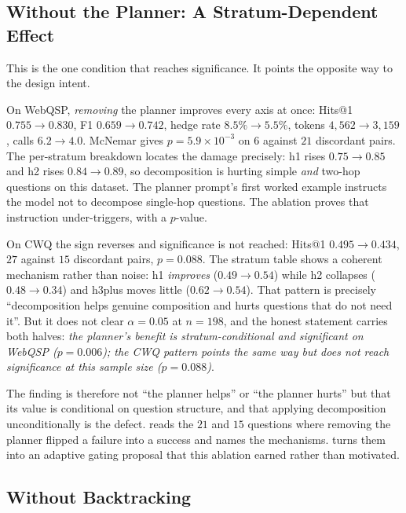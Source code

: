 \subsection{Without the Planner: A Stratum-Dependent Effect}

This is the one condition that reaches significance. It points the
opposite way to the design intent.

On WebQSP, \emph{removing} the planner improves every axis at once: Hits@1
$0.755 \to 0.830$, F1 $0.659 \to 0.742$, hedge rate $8.5\% \to 5.5\%$, tokens
$4{,}562 \to 3{,}159$, calls $6.2 \to 4.0$. McNemar gives $p = 5.9 \times
10^{-3}$ on $6$ against $21$ discordant pairs. The per-stratum breakdown locates
the damage precisely: \textsf{h1} rises $0.75 \to 0.85$ and \textsf{h2} rises
$0.84 \to 0.89$, so decomposition is hurting simple \emph{and} two-hop questions
on this dataset. The planner prompt's first worked example instructs the model
not to decompose single-hop questions. The ablation proves that instruction
under-triggers, with a $p$-value.

On CWQ the sign reverses and significance is not reached: Hits@1 $0.495 \to
0.434$, $27$ against $15$ discordant pairs, $p = 0.088$. The stratum table shows
a coherent mechanism rather than noise: \textsf{h1} \emph{improves} ($0.49
\to 0.54$) while \textsf{h2} collapses ($0.48 \to 0.34$) and \textsf{h3plus}
moves little ($0.62 \to 0.54$). That pattern is precisely ``decomposition helps
genuine composition and hurts questions that do not need it''. But it does not
clear $\alpha = 0.05$ at $n = 198$, and the honest statement carries both
halves: \emph{the planner's benefit is stratum-conditional and significant on
WebQSP ($p = 0.006$); the CWQ pattern points the same way but does not reach
significance at this sample size ($p = 0.088$)}.

The finding is therefore not ``the planner helps'' or ``the planner hurts'' but
that its value is conditional on question structure, and that applying
decomposition unconditionally is the defect. 
reads the $21$ and $15$ questions where removing the planner flipped a failure
into a success and names the mechanisms.  turns them into an
adaptive gating proposal that this ablation earned rather than motivated.

\subsection{Without Backtracking}

